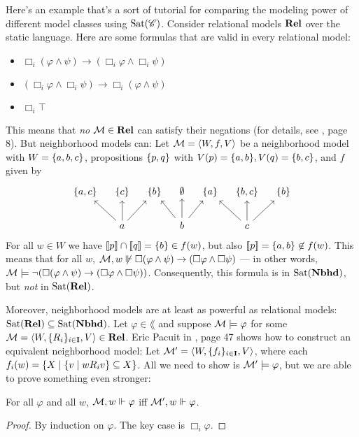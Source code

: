 \documentclass[letterpaper]{article}
\begin{document}
\begin{example*}
    Here's an example that's a sort of tutorial for comparing the modeling power of different model classes using $\mathrm{Sat}( \mathscr{C} )$.  Consider relational models $\textrm{\textbf{Rel}}$ over the static language.  Here are some formulas that are valid in every relational model:
    \begin{itemize}
        \item $\Box_i(\varphi \land \psi) \to (\Box_i \varphi \land \Box_i \psi)$
        \item $(\Box_i \varphi \land \Box_i \psi) \to \Box_i(\varphi \land \psi)$
        \item $\Box_i \top$
    \end{itemize}
    This means that \emph{no} $\mathcal{M} \in \textrm{\textbf{Rel}}$ can satisfy their negations (for details, see \cite{pacuit2017neighborhood}, page 8).  But neighborhood models can: Let $\mathcal{M} = \langle W, f, V \rangle$ be a neighborhood model with $W = \{ a, b, c \}$, propositions $\{ p, q \}$ with $V(p) = \{ a, b \}, V(q) = \{ b, c \}$, and $f$ given by
    \[
    \begin{tikzcd}[column sep=1em]
        \set{a, c} & \set{c} & \set{b} & \emptyset & \set{a} & \set{b,c} & \set{b} \\
           &  a \arrow{lu} \arrow{u} \arrow{ru}  &     &  b \arrow{lu} \arrow{u} \arrow{ru}  &    &  c \arrow{lu} \arrow{u} \arrow{ru} &
    \end{tikzcd}
    \]
    For all $w \in W$ we have $[\![\mbox{\em $ p $\/}]\!] \cap [\![\mbox{\em $ q $\/}]\!] = \{ b \} \in f(w)$, but also $[\![\mbox{\em $ p $\/}]\!] = \{ a, b \} \not \in f(w)$. This means that for all $w$, $\mathcal{M}, w \not \Vdash \Box(\varphi \land \psi) \to (\Box \varphi \land \Box \psi)$ --- in other words, $\mathcal{M} \models \neg (\Box(\varphi \land \psi) \to (\Box \varphi \land \Box \psi))$.  Consequently, this formula is in $\mathrm{Sat}( \textrm{\textbf{Nbhd}} )$, but \emph{not} in $\mathrm{Sat}( \textrm{\textbf{Rel}} )$.
    
    Moreover, neighborhood models are at least as powerful as relational models: $\mathrm{Sat}( \textrm{\textbf{Rel}} ) \subseteq \mathrm{Sat}( \textrm{\textbf{Nbhd}} )$.  Let $\varphi \in \lang$ and suppose $\mathcal{M} \models \varphi$ for some $\mathcal{M} = \langle W, \{ R_i \}_{i \in \textbf{I}}, V \rangle \in \textrm{\textbf{Rel}}$.  Eric Pacuit in \cite{pacuit2017neighborhood}, page 47 shows how to construct an equivalent neighborhood model:  Let $\mathcal{M}' = \langle W, \{ f_i \}_{i \in \textbf{I}}, V \rangle$, where each $f_i(w) = \{ X \mid \{ v \mid w{R_i}v  \} \subseteq X \}$.  All we need to show is $\mathcal{M}' \models \varphi$, but we are able to prove something even stronger:
    \begin{claim*}
        For all $\varphi$ and all $w$, $\mathcal{M}, w \Vdash \varphi$ iff $\mathcal{M}', w \Vdash \varphi$.
    \end{claim*}
    \begin{proof}
        By induction on $\varphi$.  The key case is $\Box_i \varphi$.  
        

\end{proof}
\end{example*}
\end{document}
